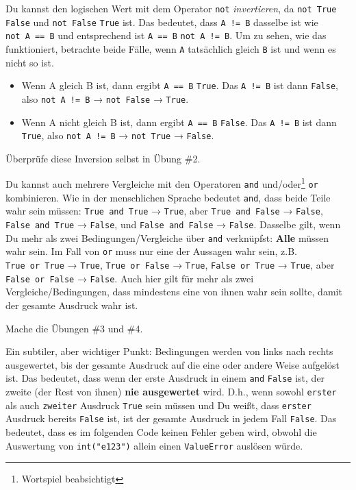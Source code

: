 \documentclass[
]{book}
\providecommand{\tightlist}{%
  \setlength{\itemsep}{0pt}\setlength{\parskip}{0pt}}
\begin{document}
Du kannst den logischen Wert mit dem Operator \texttt{not} \emph{invertieren}, da \texttt{not\ True} \texttt{False} und \texttt{not\ False} \texttt{True} ist. Das bedeutet, dass \texttt{A\ !=\ B} dasselbe ist wie \texttt{not\ A\ ==\ B} und entsprechend ist \texttt{A\ ==\ B} \texttt{not\ A\ !=\ B}. Um zu sehen, wie das funktioniert, betrachte beide Fälle, wenn \texttt{A} tatsächlich gleich \texttt{B} ist und wenn es nicht so ist.

\begin{itemize}
\tightlist
\item
  Wenn A gleich B ist, dann ergibt \texttt{A\ ==\ B} \texttt{True}. Das \texttt{A\ !=\ B} ist dann \texttt{False}, also \texttt{not\ A\ !=\ B} → \texttt{not\ False} → \texttt{True}.
\item
  Wenn A nicht gleich B ist, dann ergibt \texttt{A\ ==\ B} \texttt{False}. Das \texttt{A\ !=\ B} ist dann \texttt{True}, also \texttt{not\ A\ !=\ B} → \texttt{not\ True} → \texttt{False}.
\end{itemize}

Überprüfe diese Inversion selbst in Übung \#2.

Du kannst auch mehrere Vergleiche mit den Operatoren \texttt{and} und/oder\footnote{Wortspiel beabsichtigt} \texttt{or} kombinieren. Wie in der menschlichen Sprache bedeutet \texttt{and}, dass beide Teile wahr sein müssen: \texttt{True\ and\ True} → \texttt{True}, aber \texttt{True\ and\ False} → \texttt{False}, \texttt{False\ and\ True} → \texttt{False}, und \texttt{False\ and\ False} → \texttt{False}. Dasselbe gilt, wenn Du mehr als zwei Bedingungen/Vergleiche über \texttt{and} verknüpfst: \textbf{Alle} müssen wahr sein. Im Fall von \texttt{or} muss nur eine der Aussagen wahr sein, z.B. \texttt{True\ or\ True} → \texttt{True}, \texttt{True\ or\ False} → \texttt{True}, \texttt{False\ or\ True} → \texttt{True}, aber \texttt{False\ or\ False} → \texttt{False}. Auch hier gilt für mehr als zwei Vergleiche/Bedingungen, dass mindestens eine von ihnen wahr sein sollte, damit der gesamte Ausdruck wahr ist.

Mache die Übungen \#3 und \#4.

Ein subtiler, aber wichtiger Punkt: Bedingungen werden von links nach rechts ausgewertet, bis der gesamte Ausdruck auf die eine oder andere Weise aufgelöst ist. Das bedeutet, dass wenn der erste Ausdruck in einem \texttt{and} \texttt{False} ist, der zweite (der Rest von ihnen) \textbf{nie ausgewertet} wird. D.h., wenn sowohl \texttt{erster} als auch \texttt{zweiter} Ausdruck \texttt{True} sein müssen und Du weißt, dass \texttt{erster} Ausdruck bereits \texttt{False} ist, ist der gesamte Ausdruck in jedem Fall \texttt{False}. Das bedeutet, dass es im folgenden Code keinen Fehler geben wird, obwohl die Auswertung von \texttt{int("e123")} allein einen \texttt{ValueError} auslösen würde.
\end{document}
